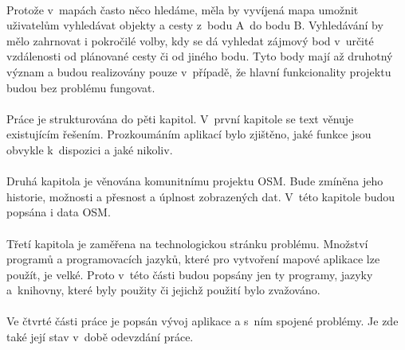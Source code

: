 \documentclass[11pt,a4paper,titlepage,oneside]{book}
\begin{document}
	\paragraph{} Protože v~mapách často něco hledáme, měla by vyvíjená mapa umožnit uživatelům vyhledávat objekty a cesty z~bodu A~do bodu B. Vyhledávání by mělo zahrnovat i pokročilé volby, kdy se dá vyhledat zájmový bod v~určité vzdálenosti od plánované cesty či od jiného bodu. Tyto body mají až druhotný význam a budou realizovány pouze v~případě, že hlavní funkcionality projektu budou bez problému fungovat.





	\paragraph{} Práce je strukturována do pěti kapitol. V~první kapitole se text věnuje existujícím řešením. Prozkoumáním aplikací bylo zjištěno, jaké funkce jsou obvykle k~dispozici a jaké nikoliv.
	\paragraph{} Druhá kapitola je věnována  komunitnímu projektu \ac{OSM}. Bude zmíněna jeho historie, možnosti a přesnost a úplnost zobrazených dat. V~této kapitole budou popsána i data \ac{OSM}. 
	\paragraph{}Třetí kapitola je zaměřena na technologickou stránku problému. Množství programů a programovacích jazyků, které pro vytvoření mapové aplikace lze použít, je velké. Proto v~této části budou popsány jen ty programy, jazyky a~knihovny, které byly použity či  jejichž použití bylo zvažováno.
	\paragraph{}Ve čtvrté části práce je popsán vývoj aplikace a s~ním spojené problémy. Je zde také její stav v~době odevzdání práce. 
\end{document}
